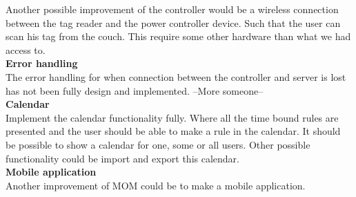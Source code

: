 Another possible improvement of the controller would be a wireless connection between the tag reader and the power controller device. Such that the user can scan his tag from the couch. This require some other hardware than what we had access to.\\

\textbf{Error handling}\\
The error handling for when connection between the controller and server is lost has not been fully design and implemented.  --More someone--\\

\textbf{Calendar}\\
Implement the calendar functionality fully. Where all the time bound rules are presented and the user should be able to make a rule in the calendar. It should be possible to show a calendar for one, some or all users. Other possible functionality could be import and export this calendar.\\

\textbf{Mobile application}\\
Another improvement of MOM could be to make a mobile application.\\